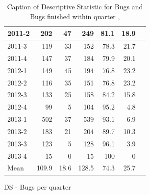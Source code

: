 \documentclass[UKenglish]{ifimaster}  %
\begin{document}
\begin{appendices}
\begin{table}[!htbp]
\begin{adjustwidth}{-1.5cm}{}
\begin{subfigure}[b]{0.4\textwidth}
{\begin{tabular}{ | l | r | r | r | r | r | r | }
2011-2 & 202 & 47 & 249 & 81.1 & 18.9 \\ \hline
2011-3 & 119 & 33 & 152 & 78.3 & 21.7 \\ \hline
2011-4 & 147 & 37 & 184 & 79.9 & 20.1 \\ \hline
2012-1 & 149 & 45 & 194 & 76.8 & 23.2 \\ \hline
2012-2 & 116 & 35 & 151 & 76.8 & 23.2 \\ \hline
2012-3 & 133 & 25 & 158 & 84.2 & 15.8 \\ \hline
2012-4 & 99 & 5 & 104 & 95.2 & 4.8 \\ \hline
2013-1 & 502 & 37 & 539 & 93.1 & 6.9 \\ \hline
2013-2 & 183 & 21 & 204 & 89.7 & 10.3 \\ \hline
2013-3 & 123 & 5 & 128 & 96.1 & 3.9 \\ \hline
2013-4 & 15 & 0 & 15 & 100 & 0 \\ \hline
Mean & 109.9&	18.6&128.5&74.3&25.7 \\ \hline

\end{tabular}
}
\caption{DS - Bugs per quarter}
 \label{DS:FTPQ:5}
\end{subfigure}
\end{adjustwidth}
\caption[Optional caption for list of figures]{Caption of Descriptive Statistic for Bugs and Bugs finished within quarter  , }
\label{DS:5:5} %
\end{table}



\end{appendices}
\end{document}
